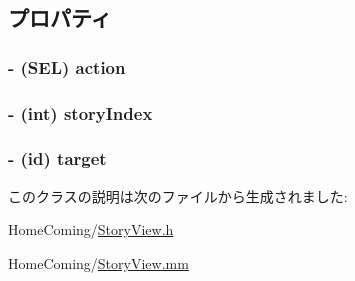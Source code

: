 \subsection{プロパティ}
\hypertarget{interface_story_view_a5b484336016f06b152943becab7e1089}{
\subsubsection[{action}]{\setlength{\rightskip}{0pt plus 5cm}-\/ (S\-E\-L) {\bf action}}}\label{interface_story_view_a5b484336016f06b152943becab7e1089}
\hypertarget{interface_story_view_a6f4fd6e85a6e6fcc6911ea70f1d6da28}{
\subsubsection[{story\-Index}]{\setlength{\rightskip}{0pt plus 5cm}-\/ (int) {\bf story\-Index}}}\label{interface_story_view_a6f4fd6e85a6e6fcc6911ea70f1d6da28}
\hypertarget{interface_story_view_ae5170731a3cb2f2a923b896ce5620b94}{
\subsubsection[{target}]{\setlength{\rightskip}{0pt plus 5cm}-\/ (id) {\bf target}}}\label{interface_story_view_ae5170731a3cb2f2a923b896ce5620b94}


このクラスの説明は次のファイルから生成されました\-:\begin{DoxyCompactItemize}
\item 
Home\-Coming/\hyperlink{_story_view_8h}{Story\-View.\-h}\item 
Home\-Coming/\hyperlink{_story_view_8mm}{Story\-View.\-mm}\end{DoxyCompactItemize}
